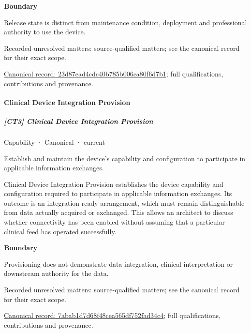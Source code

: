 \textbf{Boundary}



Release state is distinct from maintenance condition, deployment and professional authority to use the device.


{\small Recorded unresolved matters: source-qualified matters; see the canonical record for their exact scope.}\par
{\footnotesize \href{../../../../continuum/strategy/capability/23d87ead4cdc40b785b006ca80f6d7b1.md}{Canonical record: 23d87ead4cdc40b785b006ca80f6d7b1}; full qualifications, contributions and provenance.}\par
\paragraph{Clinical Device Integration Provision}

\subparagraph{[CT3] Clinical Device Integration Provision}

\label{element:7abab1d7d68f48cea565df752fad34c4}
{\small Capability · Canonical · current}\par

Establish and maintain the device’s capability and configuration to participate in applicable information exchanges.



Clinical Device Integration Provision establishes the device capability and configuration required to participate in applicable information exchanges. Its outcome is an integration-ready arrangement, which must remain distinguishable from data actually acquired or exchanged. This allows an architect to discuss whether connectivity has been enabled without assuming that a particular clinical feed has operated successfully.



\textbf{Boundary}



Provisioning does not demonstrate data integration, clinical interpretation or downstream authority for the data.


{\small Recorded unresolved matters: source-qualified matters; see the canonical record for their exact scope.}\par
{\footnotesize \href{../../../../continuum/strategy/capability/7abab1d7d68f48cea565df752fad34c4.md}{Canonical record: 7abab1d7d68f48cea565df752fad34c4}; full qualifications, contributions and provenance.}\par
